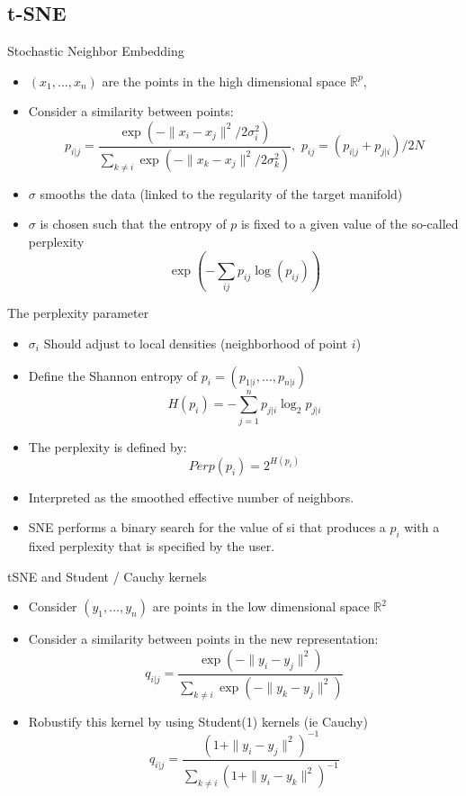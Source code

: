 \documentclass{beamer}\usepackage[]{graphicx}\usepackage[]{color}
\begin{document}
\subsection{t-SNE}



\begin{frame}{Stochastic Neighbor Embedding \cite{vandermaaten2008} }

\begin{itemize}
\item $(x_1, \hdots, x_n)$ are the points in the high dimensional space $\mathbb{R}^p$, 
\item Consider a similarity between points:
$$			
p_{i | j} = \frac{ \exp(- \| x_i - x_j \|^2 / 2 \sigma_i^2 ) }{\sum_{k \neq i} \exp(- \| x_k - x_j \|^2 / 2 \sigma_k^2)}, 
\,\, 			p_{ij} =  (p_{i | j} + p_{j | i})/ 2N
$$
\item $\sigma$ smooths the data (linked to the regularity of the target manifold)
\item $\sigma$ is chosen such that the entropy of $p$ is fixed to a given value of the so-called perplexity
$$
\exp\left( - \sum_{ij} p_{ij} \log(p_{ij}) \right)
$$
\end{itemize}
\end{frame}

\begin{frame}{The perplexity parameter}
\begin{itemize}
\item $\sigma_i$ Should adjust to local densities (neighborhood of point $i$)
\item Define the Shannon entropy of $p_i=(p_{1|i},\hdots,p_{n|i})$
$$
H(p_i) = -\sum_{j=1}^{n} p_{j|i} \log_2 p_{j|i}
$$
\item The perplexity is defined by:
$$
Perp(p_i) = 2^{H(p_i)}
$$
\item Interpreted as the smoothed effective number of neighbors.
\item SNE performs a binary search for the value of si that produces a $p_i$ with a fixed perplexity that is specified by the user.
\end{itemize}
\end{frame}

\begin{frame}{tSNE and Student / Cauchy kernels}
\begin{itemize}
\item Consider $(y_1,\hdots,y_n)$ are points in the low dimensional space $\mathbb{R}^2$
\item Consider a similarity between points in the new representation:
$$q_{i | j} = \frac{ \exp(- \| y_i - y_j \|^2  ) }{\sum_{k \neq i} \exp(- \| y_k - y_j \|^2 )}$$
\item Robustify this kernel by using Student(1) kernels (ie Cauchy)
$$q_{i | j} = \frac{ (1 + \| y_i - y_j \|^2)^{-1}  }{\sum_{k \neq i} (1 + \| y_i - y_k \|^2)^{-1}}$$
\end{itemize}
\end{frame}
\end{document}
